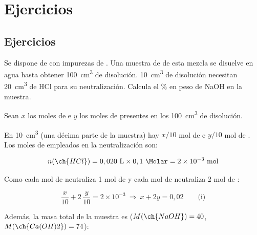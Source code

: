 

\section{Ejercicios}

\subsection{Ejercicios}

\begin{exercise}
    Se dispone de con impurezas de . Una muestra de  de esta mezcla se disuelve en agua hasta obtener \SI{100}{\cubic\centi\metre} de disolución. \SI{10}{\cubic\centi\metre} de disolución necesitan \SI{20}{\cubic\centi\metre} de HCl  para su neutralización.
    Calcula el \% en peso de NaOH en la muestra.

    \begin{solu}

        Sean \(x\) los moles de  e \(y\) los moles de  presentes en los \SI{100}{\centi\metre\cubed} de disolución.

        En \SI{10}{\centi\metre\cubed} (una décima parte de la muestra) hay \(x/10\) mol de  e \(y/10\) mol de . Los moles de  empleados en la neutralización son:

        \begin{equation*}
            n(\ch{HCl}) = 0,020 \ \si{\litre} \times 0,1 \ \si{\Molar} = \num{2e-3} \ \text{mol}
        \end{equation*}

        Como cada mol de  neutraliza 1 mol de  y cada mol de  neutraliza 2 mol de :

        \begin{equation*}
            \dfrac{x}{10} + 2\, \dfrac{y}{10} = 2 \times 10^{-3} \ \Rightarrow \ x + 2y = 0,02 \qquad \text{(i)}
        \end{equation*}

        Además, la masa total de la muestra es (\(M(\ch{NaOH}) = 40\), \(M(\ch{Ca(OH)2}) = 74\)):


\end{solu}
\end{exercise}
